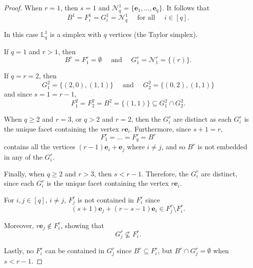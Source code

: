 \documentclass[11pt]{article}
\theoremstyle{definition}
\numberwithin{equation}{section}
\newcommand{\N}{\mathcal{N}}
\newcommand{\LL}{\mathbb{L}}
\newcommand{\be}{\mathbf{e}}
\newcommand{\qand}{\quad \mbox{ and } \quad }
\newcommand{\qforall}{\quad \mbox{ for all } \quad }
\begin{document}
\begin{proof}

When $r=1$, then $s = 1$ and $\N^1_q = \{\be_1, \ldots, \be_q\}$.
It follows that $$B^1 = F^1_i=G^1_i=\N^1_q \qforall i\in [q].$$

In this case $\LL^1_q$ is a simplex with $q$ vertices \textup{(}the
Taylor simplex\textup{)}.

If $q=1$ and $r>1$, then $$B^r=F^r_1=\emptyset \qand
G^r_1=\N^r_1 = \{(r)\}.$$

If $q = r = 2$, then
$$G^2_1 = \{(2,0),(1,1)\} \qand G^2_2 = \{(0,2),(1,1)\}$$ and since
$s=1=r-1$,
$$F^2_1=F^2_2=B^2=\{(1,1)\} \subseteq G^2_1\cap G^2_2.$$

When $q\ge2$ and $r=3$, or $q >2$ and $r = 2$, then the $G_i^r$
are distinct as each $G_i^r$ is the unique facet containing the vertex
$r\be_i$.  Furthermore, since $s+1=r$,
$$F^r_1=\dots=F^r_q=B^r$$ contains all the vertices $(r-1)\be_i+\be_j$
where $i\neq j$, and so $B^r$ is not embedded in any of the $G_i^r$.

Finally, when $q\ge2$ and $r>3$, then $s <
                r-1$. Therefore, the $G_i^r$ are distinct, since each
                $G_i^r$ is the unique facet containing the vertex
                $r\be_i$.

For $i, j \in [q]$, $i\neq j$, $F^r_j$ is not
                contained in $F^r_i$ since
$$(s+1) \be_j + (r - s-1) \be_i \in F^r_j \setminus F^r_i.$$

Moreover, $r \be_j \notin F^r_i$, showing that $$G^r_j \nsubseteq F^r_i.$$

Lastly, no $F^r_i$ can be contained in $G^r_j$ since $B^r \subseteq F^r_i$,
but $B^r \cap G^r_j = \emptyset$ when $s < r-1$.
\end{proof}
\end{document}
